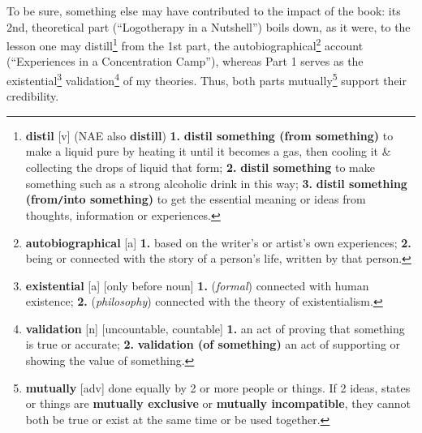 \documentclass[oneside]{book}
\numberwithin{equation}{section}
\begin{document}
To be sure, something else may have contributed to the impact of the book: its 2nd, theoretical part (``Logotherapy in a Nutshell'') boils down, as it were, to the lesson one may distill\footnote{\textbf{distil} [v] (NAE also \textbf{distill}) \textbf{1.} \textbf{distil something (from something)} to make a liquid pure by heating it until it becomes a gas, then cooling it \& collecting the drops of liquid that form; \textbf{2.} \textbf{distil something} to make something such as a strong alcoholic drink in this way; \textbf{3.} \textbf{distil something (from\texttt{/}into something)} to get the essential meaning or ideas from thoughts, information or experiences.} from the 1st part, the autobiographical\footnote{\textbf{autobiographical} [a] \textbf{1.} based on the writer's or artist's own experiences; \textbf{2.} being or connected with the story of a person's life, written by that person.} account (``Experiences in a Concentration Camp''), whereas Part 1 serves as the existential\footnote{\textbf{existential} [a] [only before noun] \textbf{1.} (\textit{formal}) connected with human existence; \textbf{2.} (\textit{philosophy}) connected with the theory of existentialism.} validation\footnote{\textbf{validation} [n] [uncountable, countable] \textbf{1.} an act of proving that something is true or accurate; \textbf{2.} \textbf{validation (of something)} an act of supporting or showing the value of something.} of my theories. Thus, both parts mutually\footnote{\textbf{mutually} [adv] done equally by 2 or more people or things. If 2 ideas, states or things are \textbf{mutually exclusive} or \textbf{mutually incompatible}, they cannot both be true or exist at the same time or be used together.} support their credibility.
\end{document}
